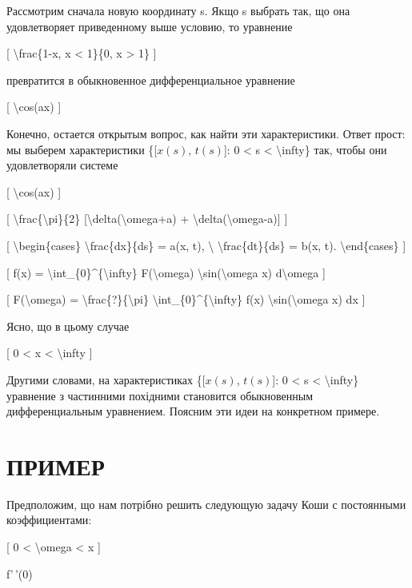 \documentclass[
]{article}
\begin{document}
Рассмотрим сначала новую координату s. Якщо s выбрать так, що она
удовлетворяет приведенному выше условию, то уравнение

{[} \textbackslash frac\{1-\textbar x\textbar, \textbar x\textbar{}
\textless{} 1\}\{0, \textbar x\textbar{} \textgreater{} 1\} {]}

превратится в обыкновенное дифференциальное уравнение

{[} \textbackslash cos(ax) {]}

Конечно, остается открытым вопрос, как найти эти характеристики. Ответ
прост: мы выберем характеристики \{{[}\(x(s)\), \(t(s)\){]}: 0
\textless{} s \textless{} \textbackslash infty\} так, чтобы они
удовлетворяли системе

{[} \textbackslash cos(ax) {]}

{[} \textbackslash frac\{\textbackslash pi\}\{2\}
{[}\textbackslash delta(\textbackslash omega+a) +
\textbackslash delta(\textbackslash omega-a){]} {]}

{[} \textbackslash begin\{cases\} \textbackslash frac\{dx\}\{ds\} = a(x,
t), \textbackslash{} \textbackslash frac\{dt\}\{ds\} = b(x, t).
\textbackslash end\{cases\} {]}

{[} f(x) = \textbackslash int\_\{0\}\^{}\{\textbackslash infty\}
F(\textbackslash omega) \textbackslash sin(\textbackslash omega x)
d\textbackslash omega {]}

{[} F(\textbackslash omega) =
\textbackslash frac\{?\}\{\textbackslash pi\}
\textbackslash int\_\{0\}\^{}\{\textbackslash infty\} f(x)
\textbackslash sin(\textbackslash omega x) dx {]}

Ясно, що в цьому случае

{[} 0 \textless{} x \textless{} \textbackslash infty {]}

Другими словами, на характеристиках \{{[}\(x(s)\), \(t(s)\){]}: 0
\textless{} s \textless{} \textbackslash infty\} уравнение з частинними
похідними становится обыкновенным дифференциальным уравнением. Поясним
эти идеи на конкретном примере.

\section{ПРИМЕР}\label{ux43fux440ux438ux43cux435ux440}

Предположим, що нам потрібно решить следующую задачу Коши с постоянными
коэффициентами:

{[} 0 \textless{} \textbackslash omega \textless{} x {]}

f'\,'(0)
\end{document}

